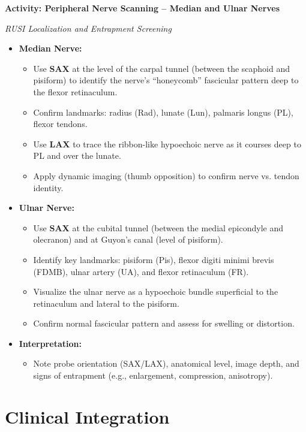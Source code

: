 \begin{labactivitybox}
\textbf{Activity: Peripheral Nerve Scanning – Median and Ulnar Nerves}

\textit{RUSI Localization and Entrapment Screening}

\begin{itemize}
  \item \textbf{Median Nerve:}
  \begin{itemize}
    \item Use \textbf{SAX} at the level of the carpal tunnel (between the scaphoid and pisiform) to identify the nerve’s “honeycomb” fascicular pattern deep to the flexor retinaculum.
    \item Confirm landmarks: radius (Rad), lunate (Lun), palmaris longus (PL), flexor tendons.
    \item Use \textbf{LAX} to trace the ribbon-like hypoechoic nerve as it courses deep to PL and over the lunate.
    \item Apply dynamic imaging (thumb opposition) to confirm nerve vs. tendon identity.
  \end{itemize}

  \item \textbf{Ulnar Nerve:}
  \begin{itemize}
    \item Use \textbf{SAX} at the cubital tunnel (between the medial epicondyle and olecranon) and at Guyon’s canal (level of pisiform).
    \item Identify key landmarks: pisiform (Pis), flexor digiti minimi brevis (FDMB), ulnar artery (UA), and flexor retinaculum (FR).
    \item Visualize the ulnar nerve as a hypoechoic bundle superficial to the retinaculum and lateral to the pisiform.
    \item Confirm normal fascicular pattern and assess for swelling or distortion.
  \end{itemize}

  \item \textbf{Interpretation:}
  \begin{itemize}
    \item Note probe orientation (SAX/LAX), anatomical level, image depth, and signs of entrapment (e.g., enlargement, compression, anisotropy).
  \end{itemize}
\end{itemize}
\end{labactivitybox}

\section*{Clinical Integration}

